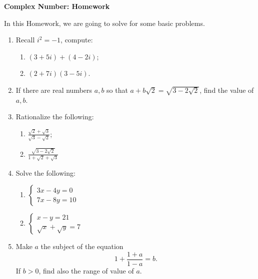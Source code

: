 \documentclass[12pt]{article}
\begin{document}
    \begin{center}
        \textbf{Complex Number: Homework}
    \end{center}

    In this Homework, we are going to solve for some basic problems.

    \begin{enumerate}
        \item Recall $i^2=-1$, compute:\begin{enumerate}
            \item $(3+5i)+(4-2i)$;
            \item $(2+7i)(3-5i)$.
        \end{enumerate}
        \item If there are real numbers $a,b$ so that $a+b\sqrt{2}=\sqrt{3-2\sqrt{2}}$, find the value of $a,b$.
        \item Rationalize the following:\begin{enumerate}
            \item $\frac{\sqrt{2}+\sqrt{3}}{\sqrt{3}-\sqrt{2}}$;
            \item $\frac{\sqrt{3-2\sqrt{2}}}{1+\sqrt{2}+\sqrt{3}}$
        \end{enumerate}
        \item Solve the following: \begin{enumerate}
            \item $\begin{cases}
                3x-4y=0\\
                7x-8y=10
            \end{cases}$
            \item $\begin{cases}
                x-y=21\\
                \sqrt{x}+\sqrt{y}=7
            \end{cases}$
        \end{enumerate}
        \item Make $a$ the subject of the equation $$1+\frac{1+a}{1-a}=b.$$ If $b>0$, find also the range of value of $a$.
    \end{enumerate}
\end{document}
